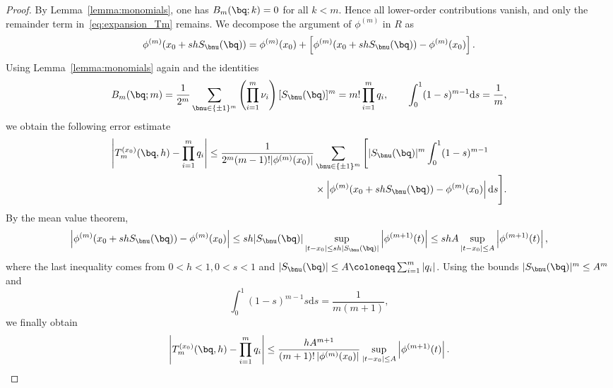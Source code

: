 \documentclass[11pt]{article}
\begin{document}
\begin{proof}
    By Lemma~\ref{lemma:monomials}, one has $B_m(\bq; k) = 0$ for all $k<m$. Hence all lower-order contributions vanish, and only the remainder term in~\eqref{eq:expansion_Tm} remains. We decompose the argument of $\phi^{(m)}$ in $R$ as
    \begin{equation*}
        \phi^{(m)}(x_0 + s h S_{\bnu}(\bq)) = \phi^{(m)}(x_0)  +  \left[\phi^{(m)}(x_0 + s h S_{\bnu}(\bq)) - \phi^{(m)}(x_0) \right].
    \end{equation*}
    Using Lemma~\ref{lemma:monomials} again and the identities
    \begin{equation*}
        B_m(\bq;m) = \frac{1}{2^m} \sum_{\bnu \in \{\pm 1\}^m} \left( \prod_{i=1}^m \nu_i \right) [S_{\bnu}(\bq)]^m = m! \prod_{i=1}^m q_i, \quad \quad  \int_0^1 (1 - s)^{m-1} \mathrm{d} s = \frac{1}{m},
    \end{equation*}
    we obtain the following error estimate
    \begin{equation*}
        \begin{aligned}
             \left| T_{m}^{(x_0)}(\bq, h) - \prod_{i=1}^m q_i\right| \leq \frac{1}{2^m (m-1)! |\phi^{(m)}(x_0)|} & \sum_{\bnu \in \{ \pm 1\}^m}   \Bigg[|S_{\bnu}(\bq)|^m \int_0^1 (1 -s)^{m-1} \\
             &\times  \left|\phi^{(m)}(x_0 + s h S_{\bnu}(\bq)) - \phi^{(m)}(x_0) \right| \mathrm{d} s\Bigg] .
        \end{aligned}
    \end{equation*}
    By the mean value theorem,
    \begin{equation*}
        \left|
          \phi^{(m)}(x_0 + s h S_{\bnu}(\bq)) - \phi^{(m)}(x_0)
        \right|
        \leq s h |S_{\bnu}(\bq)|
          \sup_{|t - x_0| \leq s h |S_{\bnu}(\bq)|}
          \left| \phi^{(m+1)}(t) \right|
        \leq s h A
          \sup_{|t - x_0| \leq  A}
          \left| \phi^{(m+1)}(t) \right|,
    \end{equation*}
    where the last inequality comes from $0<h<1, 0<s<1$ and $|S_{\bnu}(\bq)| \leq A\coloneqq  \sum_{i=1}^m |q_i|$. Using the bounds $|S_{\bnu}(\bq)|^m \leq A^{m}$ and 
    \begin{equation*}
         \int_0^1 (1 - s)^{m-1} s \mathrm{d} s = \frac{1}{m (m+1)},
    \end{equation*}
    we finally obtain
    \begin{equation*}
        \left|
          T_{m}^{(x_0)}(\bq,h) - \prod_{i=1}^m q_i
        \right|
        \leq 
        \frac{h A^{m+1}}{(m+1)! \, |\phi^{(m)}(x_0)|}
        \sup_{|t - x_0| \leq  A}
        \left| \phi^{(m+1)}(t) \right|.
    \end{equation*}
\end{proof}
\end{document}
